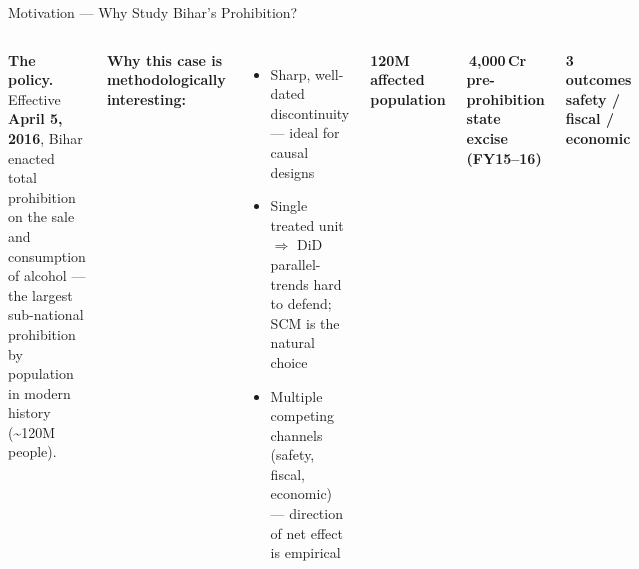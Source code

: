 \documentclass[aspectratio=169,11pt]{beamer}
\newcommand{\highlight}[1]{\textcolor{AmberDark}{\textbf{#1}}}
\newcommand{\navy}[1]{\textcolor{NavyPrimary}{\textbf{#1}}}
\newcommand{\rupee}{\faRupeeSign\,}
\newcommand{\toptight}{\vspace{-0.15cm}}
\begin{document}
\begin{frame}{Motivation --- Why Study Bihar's Prohibition?}
  \toptight
  \begin{columns}[T,onlytextwidth]
      \begin{tcolorbox}[amberbox]
        \footnotesize\textbf{The policy.} Effective \highlight{April 5, 2016},
        Bihar enacted total prohibition on the sale and consumption of
        alcohol --- the largest sub-national prohibition by population in
        modern history (\textasciitilde 120M people).
      \end{tcolorbox}
      \vspace{0.25cm}
      \textbf{\navy{\small Why this case is methodologically interesting:}}
      \begin{itemize}
        \item Sharp, well-dated discontinuity --- ideal for causal designs
        \item Single treated unit $\Rightarrow$ DiD parallel-trends hard to
              defend; SCM is the natural choice
        \item Multiple competing channels (safety, fiscal, economic) ---
              direction of net effect is empirical
      \end{itemize}

      \begin{tcolorbox}[statbox,width=\linewidth]
        \fontsize{22}{26}\selectfont\bfseries\color{AmberAccent}120M\\
        \scriptsize\color{white}affected population
      \end{tcolorbox}
      \vspace{0.18cm}
      \begin{tcolorbox}[statbox,width=\linewidth]
        \fontsize{22}{26}\selectfont\bfseries\color{AmberAccent}\rupee 4{,}000\,Cr\\
        \scriptsize\color{white}pre-prohibition state excise (FY15--16)
      \end{tcolorbox}
      \vspace{0.18cm}
      \begin{tcolorbox}[statbox,width=\linewidth]
        \fontsize{22}{26}\selectfont\bfseries\color{AmberAccent}3 outcomes\\
        \scriptsize\color{white}safety / fiscal / economic
      \end{tcolorbox}
  \end{columns}
\end{frame}
\end{document}
